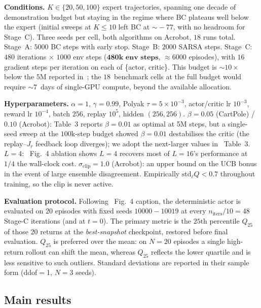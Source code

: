 \documentclass[10pt]{article}
\begin{document}
\textbf{Conditions.} $K\!\in\!\{20,50,100\}$ expert trajectories,
spanning one decade of demonstration budget but staying in the regime
where BC plateaus well below the expert (initial sweeps at
$K\!\le\!10$ left BC at $\sim\!-77$, with no headroom for Stage~C).
Three seeds per cell, both algorithms on Acrobot, $18$ runs total. Stage~A: $5000$ BC steps with early stop. Stage~B: $2000$
SARSA steps. Stage~C: $480$ iterations $\times$ $1000$ env steps
($\textbf{480k env steps}$, $\approx\!6000$ episodes), with $16$
gradient steps per iteration on each of \{actor, critic\}. This budget
is $\sim\!10\!\times$ below the $5$M reported in~\cite{watson2023csil};
the $18$~benchmark cells at the full budget would require
$\sim\!7$~days of single-GPU compute, beyond the available allocation.

\textbf{Hyperparameters.} $\alpha\!=\!1$, $\gamma\!=\!0.99$, Polyak
$\tau\!=\!5\!\times\!10^{-3}$, actor/critic lr $10^{-3}$, reward lr
$10^{-4}$, batch $256$, replay $10^5$, hidden $(256,256)$.
$\beta\!=\!0.05$ (CartPole) / $0.10$ (Acrobot): \cite{watson2023csil}
Table~3 reports $\beta\!=\!0.01$ as optimal at 5M steps, but a
single-seed sweep at the $100$k-step budget showed $\beta\!=\!0.01$
destabilises the critic (the replay--$J_r$ feedback loop diverges);
we adopt the next-larger values in \cite{watson2023csil}~Table~3.
$L\!=\!4$: \cite{viel2025ilsoar}~Fig.~4 ablation shows $L\!=\!4$
recovers most of $L\!=\!16$'s performance at $1/4$ the wall-clock cost.
$\sigma_{\mathrm{clip}}\!=\!1.0$ (Acrobot): an upper bound on the
UCB bonus in the event of large ensemble disagreement. Empirically
$\mathrm{std}_\ell Q\!<\!0.7$ throughout training, so the clip is
never active.

\textbf{Evaluation protocol.} Following \cite{watson2023csil}~Fig.~4
caption, the deterministic actor is evaluated on $20$ episodes with
fixed seeds $10000\!-\!10019$ at every $n_\mathrm{iters}/10\!=\!48$
Stage-C iterations (and at $t\!=\!0$). The primary metric is the
$25\mathrm{th}$ percentile $Q_{25}$ of those $20$ returns at the
\emph{best-snapshot} checkpoint, restored before final evaluation.
$Q_{25}$ is preferred over the mean: on $N\!=\!20$ episodes a single
high-return rollout can shift the mean, whereas $Q_{25}$ reflects
the lower quartile and is less sensitive to such outliers. Standard
deviations are reported in their sample form (ddof$=$1, $N\!=\!3$
seeds).

\subsection{Main results}
\end{document}

